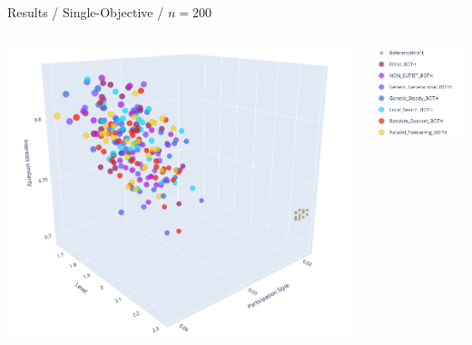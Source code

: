 \documentclass{beamer}
\begin{document}
    \begin{frame}{Results / Single-Objective / $n=200$}
            \begin{columns}
                \begin{column}{0.70\textwidth}
                    \includegraphics[width=\textwidth]{images/200_single.png}
                \end{column}
                \begin{column}{0.30\textwidth}
                    \includegraphics[width=\textwidth]{images/legend_single.png}
                \end{column}
            \end{columns}\\
    \end{frame}
    
\end{document}
